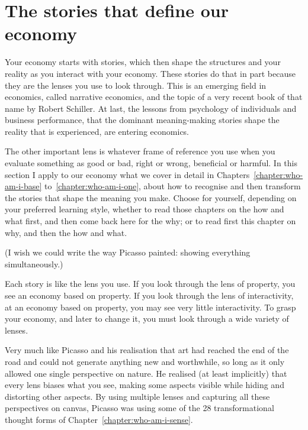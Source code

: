\section{The stories that define our economy}
\label{section:stories-define-economy}
Your economy starts with stories, which then shape the structures and your reality as you interact with your economy. These stories do that in part because they are the lenses you use to look through. This is an emerging field in economics, called narrative economics, and the topic of a very recent book of that name by Robert Schiller\cite{shiller-narrative-economics}. At last, the lessons from psychology of individuals and business performance, that the dominant meaning\hyp{}making stories shape the reality that is experienced, are entering economics. 


The other important lens is whatever frame of reference you use when you evaluate something as good or bad, right or wrong, beneficial or harmful. In this section I apply to our economy what we cover in detail in Chapters~\ref{chapter:who-am-i-base} to~\ref{chapter:who-am-i-one}, about how to recognise and then transform the stories that shape the meaning you make. Choose for yourself, depending on your preferred learning style, whether to read those chapters on the how and what first, and then come back here for the why; or to read first this chapter on why, and then the how and what.


(I wish we could write the way Picasso painted: showing everything simultaneously.)


Each story is like the lens you use. If you look through the lens of property, you see an economy based on property. If you look through the lens of interactivity, at an economy based on property, you may see very little interactivity. To grasp your economy, and later to change it, you must look through a wide variety of lenses.


Very much like Picasso and his realisation that art had reached the end of the road and could not generate anything new and worthwhile, so long as it only allowed one single perspective on nature.  He realised (at least implicitly)  that every lens biases what you see, making some aspects visible while hiding and distorting other aspects. By using multiple lenses and capturing all these perspectives on canvas, Picasso was using some of the 28 transformational thought forms of Chapter~\ref{chapter:who-am-i-sense}. 



